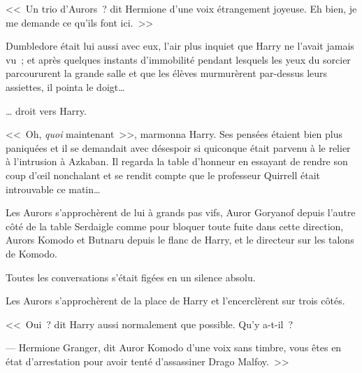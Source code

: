 <<~Un trio d'Aurors~? dit Hermione d'une voix étrangement joyeuse. Eh bien, je me demande ce qu'ils font ici.~>>

Dumbledore était lui aussi avec eux, l'air plus inquiet que Harry ne l'avait jamais vu~; et après quelques instants d'immobilité pendant lesquels les yeux du sorcier parcoururent la grande salle et que les élèves murmurèrent par-dessus leurs assiettes, il pointa le doigt…

… droit vers Harry.

<<~Oh, \emph{quoi} maintenant~>>, marmonna Harry. Ses pensées étaient bien plus paniquées et il se demandait avec désespoir si quiconque était parvenu à le relier à l'intrusion à Azkaban. Il regarda la table d'honneur en essayant de rendre son coup d'œil nonchalant et se rendit compte que le professeur Quirrell était introuvable ce matin…

Les Aurors s'approchèrent de lui à grands pas vifs, Auror Goryanof depuis l'autre côté de la table Serdaigle comme pour bloquer toute fuite dans cette direction, Aurors Komodo et Butnaru depuis le flanc de Harry, et le directeur sur les talons de Komodo.

Toutes les conversations s'était figées en un silence absolu.

Les Aurors s'approchèrent de la place de Harry et l'encerclèrent sur trois côtés.

<<~Oui~? dit Harry aussi normalement que possible. Qu'y a-t-il~?

--- Hermione Granger, dit Auror Komodo d'une voix sans timbre, vous êtes en état d'arrestation pour avoir tenté d'assassiner Drago Malfoy.~>> 

